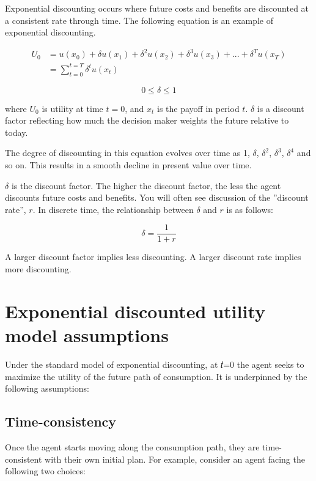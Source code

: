 \documentclass[
  letterpaper,
  DIV=11,
  numbers=noendperiod]{scrreprt}
\begin{document}
Exponential discounting occurs where future costs and benefits are
discounted at a consistent rate through time. The following equation is
an example of exponential discounting.

\begin{align*}
U_0&=u(x_0)+\delta u(x_1)+\delta^2u(x_2)+\delta^3u(x_3)+...+\delta^Tu(x_T) \\[6pt]
&=\sum_{t=0}^{t=T}\delta^tu(x_t)
\end{align*}

\[0\leq \delta\leq1\]

where \(U_0\) is utility at time \(t=0\), and \(x_t\) is the payoff in
period \(t\). \(\delta\) is a discount factor reflecting how much the
decision maker weights the future relative to today.

The degree of discounting in this equation evolves over time as 1,
\(\delta\), \(\delta^2\), \(\delta^3\), \(\delta^4\) and so on. This
results in a smooth decline in present value over time.

\(\delta\) is the discount factor. The higher the discount factor, the
less the agent discounts future costs and benefits. You will often see
discussion of the ''discount rate'', \(r\). In discrete time, the
relationship between \(\delta\) and \(r\) is as follows:

\[\delta=\frac{1}{1+r}\]

A larger discount factor implies less discounting. A larger discount
rate implies more discounting.

\hypertarget{exponential-discounted-utility-model-assumptions}{%
\section{Exponential discounted utility model
assumptions}\label{exponential-discounted-utility-model-assumptions}}

Under the standard model of exponential discounting, at 𝑡=0 the agent
seeks to maximize the utility of the future path of consumption. It is
underpinned by the following assumptions:

\hypertarget{time-consistency}{%
\subsection{Time-consistency}\label{time-consistency}}

Once the agent starts moving along the consumption path, they are
time-consistent with their own initial plan. For example, consider an
agent facing the following two choices:
\end{document}
